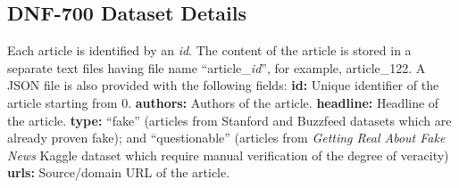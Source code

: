 \documentclass[11pt,a4paper]{article}
\begin{document}
\subsection{DNF-700 Dataset Details} 
\label{sect:700dataset}
Each article is identified by an \textit{id}. The content of the article is stored in a separate text files having file name {``article\_\textit{id}''}, for example, {article\_122}. A JSON file is also provided with the following fields:\newline \newline
\textbf{id:} Unique identifier of the article starting from 0.\newline
\textbf{authors:} Authors of the article.\newline
\textbf{headline:} Headline of the article. \newline
\textbf{type:} ``fake'' (articles from Stanford and Buzzfeed datasets which are already proven fake); and ``questionable'' (articles from \textit{Getting Real About Fake News} Kaggle dataset which require manual verification of the degree of veracity)  \newline
\textbf{urls:} Source/domain URL of the article. \newline
\end{document}
